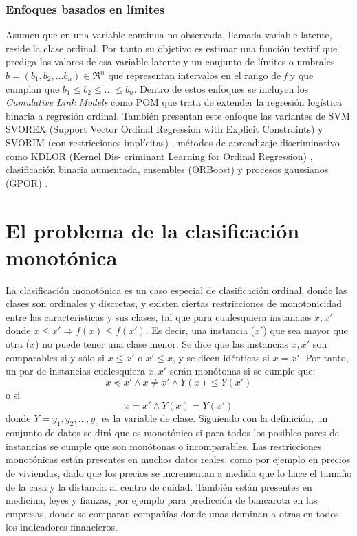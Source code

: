 \subsubsection{Enfoques basados en límites}
Asumen que en una variable continua no observada, llamada variable latente, reside la clase ordinal. Por tanto su objetivo es estimar una función textit{f} que prediga los valores de esa variable latente y un conjunto de límites o umbrales $b= (b_1,b_2,...b_n) \in \Re^n$ que representan intervalos en el rango de \textit{f} y que cumplan que $b_1 \le b_2 \le ... \le b_n$. Dentro de estos enfoques se incluyen los \textit{Cumulative Link Models} como POM \cite{mccullagh1980regression} que trata de extender la regresión logística binaria a regresión ordinal. También presentan este enfoque las variantes de SVM  SVOREX (Support Vector Ordinal Regression with
Explicit Constraints) y SVORIM (con restricciones implícitas) \cite{chu2007support}, métodos de aprendizaje discriminativo como KDLOR (Kernel Dis-
criminant Learning for Ordinal Regression) \cite{sun2010kernel}, clasificación binaria aumentada, ensembles (ORBoost) \cite{lin2006large} y procesos gaussianos (GPOR) \cite{chu2005gaussian}.
\section{El problema de la clasificación monotónica}
La clasificación monotónica es un caso especial de clasificación ordinal, donde las clases son ordinales y discretas, y existen ciertas restricciones de monotonicidad entre las características y sus clases, tal que para cualesquiera instancias $x, x'$ donde $x \le x' \Rightarrow f(x) \le f(x')$. Es decir, una instancia ($x'$) que sea mayor que otra ($x$) no puede tener una clase menor. Se dice que las instancias $x, x'$ son comparables si y sólo si $x \leq x'$ o $x' \leq x$, y se dicen idénticas si $x=x'$. Por tanto, un par de instancias cualesquiera $x,x'$ serán monótonas si se cumple que: 
$$ x \preceq x' \land x \neq x' \land Y(x) \leq Y(x')$$ o si $$x=x' \land Y(x)=Y(x')$$ donde $Y={y_1,y_2,...,y_c}$ es la variable de clase. \newline
Siguiendo con la definición, un conjunto de datos se dirá que es monotónico si para todos los posibles pares de instancias se cumple que son monótonas o incomparables. \newline
Las restricciones monotónicas están presentes en muchos datos reales, como por ejemplo en precios de viviendas, dado que los precios se incrementan a medida que lo hace el tamaño de la casa y la distancia al centro de cuidad. También están presentes en medicina, leyes y fianzas, por ejemplo para predicción de bancarota en las empresas, donde se comparan compañías donde unas dominan a otras en todos los indicadores financieros.
